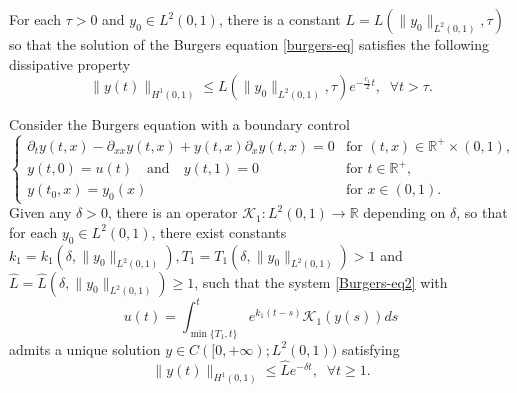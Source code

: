 \documentclass[10pt,a4paper]{amsart}
\begin{document}
\begin{lemma}
\label{diss-property}
    For each $\tau>0$ and $y_0\in L^2(0,1)$, there is a constant $L=L\left(\|y_0\|_{L^2(0,1)},\tau\right)$ so that the solution of the Burgers equation \eqref{burgers-eq} satisfies the following dissipative property
     \begin{equation}
         \label{diss-property-burgers}
         \| y(t)\|_{H^1(0,1)}\le L\left(\|y_0\|_{L^2(0,1)},\tau\right)e^{-\frac{c_1 }{2}t},\;\;\forall t>\tau.
     \end{equation}
\end{lemma}

\begin{theorem}
\label{global-exp-sta-burgers}
    Consider the Burgers equation with a boundary control
    \begin{equation}
    \label{Burgers-eq2}
\left\{\begin{array}{ll}
\partial_t y(t,x)- \partial_{xx}y(t,x)+y (t,x) \partial_x y(t,x)=0 & \text{for }(t,x)\in \mathbb{R}^+\times (0,1),\\[2mm]
y( t,0)=u(t)\quad\text{and}\quad y( t,1)=0& \text{for }t\in \mathbb{R}^+,\\[2mm]
y(t_0,x)=y_0(x)& \text{for }x\in (0,1).
\end{array}\right.
\end{equation}
Given any $\delta>0$, there is an operator $\mathcal{K}_1:L^2(0,1)\to \mathbb{R}$ depending on $\delta$, so that for each $y_0\in L^2(0,1)$, there exist constants ${k}_1=k_1\left(\delta,\|y_0\|_{L^2(0,1)}\right),{T}_1=T_1\left(\delta,\|y_0\|_{L^2(0,1)}\right)>1$ and $\hat{L}=\hat{L}\left(\delta,\|y_0\|_{L^2(0,1)}\right)\ge 1$, such that the system \eqref{Burgers-eq2} with 
\begin{equation}
    \label{u}
    {u}(t)=\int_{\min\{{T}_1,t\}}^t e^{k_1(t-s)}{\mathcal{K}}_1(y(s))ds
\end{equation}
admits a unique solution $y\in C([0,+\infty);L^2(0,1))$ satisfying
\begin{equation}
    \label{global-burgers}
    \|y(t)\|_{H^1(0,1)}\le\hat{L}e^{-\delta t},\;\;\forall t\ge 1.
\end{equation}
\end{theorem}
\end{document}
